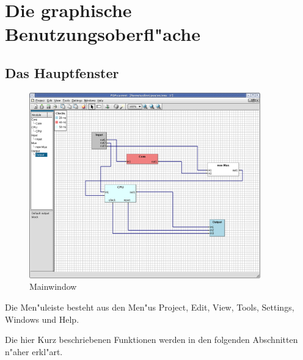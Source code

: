\documentclass[a4paper,titlepage,12pt,ngerman]{scrbook}
\begin{document}
\chapter{Die graphische Benutzungsoberfl"ache}

\section{Das Hauptfenster}
\begin{figure}[htbp]

\begin{center}

\includegraphics[width=10cm]{Mainwindow1}

\caption{Mainwindow}\label{test}

\end{center}

\end{figure}

Die Men"uleiste besteht aus den Men"us Project, Edit, View, Tools, Settings, Windows und Help.\par

Die hier Kurz beschriebenen Funktionen werden in den folgenden Abschnitten n"aher erkl"art.\par
\end{document}
